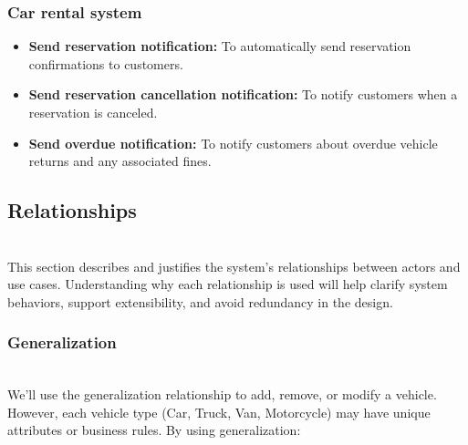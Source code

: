 \subsubsection{Car rental system}\label{V8v_21cup7Z3JwtXhNeYX}

\begin{itemize}
\item
\protect{}\label{q50d_3X8D2ku5v1Ol8kMN}
\textbf{Send reservation notification:} To automatically send reservation confirmations to customers.
\item
\protect{}\label{6A14id-Izr5GXG7aNUBCj}
\textbf{Send reservation cancellation notification:} To notify customers when a reservation is canceled.
\item
\protect{}\label{w1ZxycMKW2uSPh8uMipiL}
\textbf{Send overdue notification:} To notify customers about overdue vehicle returns and any associated fines.
\end{itemize}

\subsection{Relationships}\label{MSkgMhl8HcMAtBoMqNim1}
\\
This section describes and justifies the system's relationships between actors and use cases. Understanding why each relationship is used will help clarify system behaviors, support extensibility, and avoid redundancy in the design.

\subsubsection{Generalization}\label{TWu5r58Co4xord30p8RBe}
\\
We'll use the generalization relationship to add, remove, or modify a vehicle. However, each vehicle type (Car, Truck, Van, Motorcycle) may have unique attributes or business rules. By using generalization:

